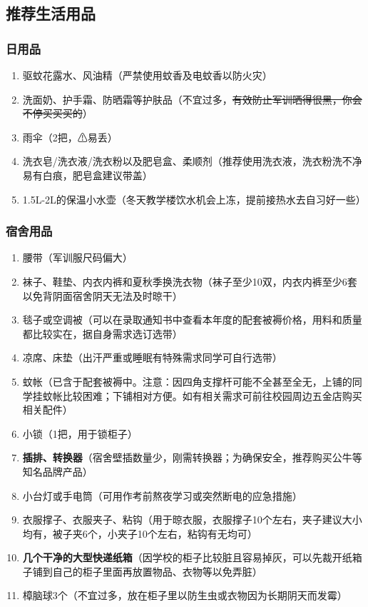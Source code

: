 \subsection[推荐生活用品]{推荐生活用品}

\subsubsection[日用品]{日用品}
\begin{enumerate}
      \item 驱蚊花露水、风油精（严禁使用蚊香及电蚊香以防火灾）
      \item 洗面奶、护手霜、防晒霜等护肤品（不宜过多，\sout{有效防止军训晒得很黑，你会不停买买买的}）
      \item 雨伞（2把，⚠易丢）
      \item 洗衣皂/洗衣液/洗衣粉以及肥皂盒、柔顺剂（推荐使用洗衣液，洗衣粉洗不净易有白痕，肥皂盒建议带盖）
      \item 1.5L-2L的保温小水壶（冬天教学楼饮水机会上冻，提前接热水去自习好一些）
\end{enumerate}

\subsubsection[宿舍用品]{宿舍用品}
\begin{enumerate}
      \item 腰带（军训服尺码偏大）
      \item 袜子、鞋垫、内衣内裤和夏秋季换洗衣物（袜子至少10双，内衣内裤至少6套以免背阴面宿舍阴天无法及时晾干）
      \item 毯子或空调被（可以在录取通知书中查看本年度的配套被褥\footnotemark 价格，用料和质量都比较实在，据自身需求选订选带）
      \item 凉席、床垫\footnotemark（出汗严重或睡眠有特殊需求同学可自行选带）
      \item 蚊帐（已含于配套被褥中。注意：因四角支撑杆可能不全甚至全无，上铺的同学挂蚊帐比较困难；下铺相对方便。如有相关需求可前往校园周边五金店购买相关配件）
      \item 小锁（1把，用于锁柜子）
      \item \textbf{插排、转换器}（宿舍壁插数量少，刚需转换器；为确保安全，推荐购买公牛等知名品牌产品）
      \item 小台灯或手电筒（可用作考前熬夜学习或突然断电的应急措施）
      \item 衣服撑子、衣服夹子、粘钩（用于晾衣服，衣服撑子10个左右，夹子建议大小均有，被子夹6个，小夹子10个左右，粘钩有无均可）
      \item \textbf{几个干净的大型快递纸箱}（因学校的柜子比较脏且容易掉灰，可以先裁开纸箱子铺到自己的柜子里面再放置物品、衣物等以免弄脏）
      \item 樟脑球3个（不宜过多，放在柜子里以防生虫或衣物因为长期阴天而发霉）
\end{enumerate}

